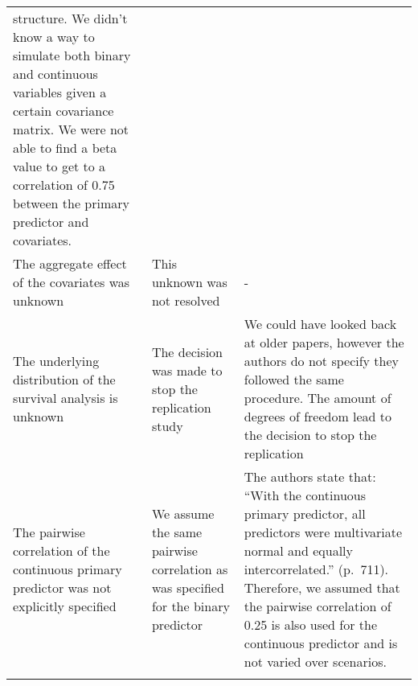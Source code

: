 \documentclass[10,a4paperpaper,]{article}
\begin{document}
\begin{longtable}[]{@{}lll@{}}
\begin{minipage}[t]{0.30\columnwidth}
structure. We didn't know a way to simulate both binary and continuous
variables given a certain covariance matrix. We were not able to find a
beta value to get to a correlation of 0.75 between the primary predictor
and covariates.\strut
\end{minipage}\tabularnewline
\begin{minipage}[t]{0.30\columnwidth}\raggedright
The aggregate effect of the covariates was unknown\strut
\end{minipage} & \begin{minipage}[t]{0.30\columnwidth}\raggedright
This unknown was not resolved\strut
\end{minipage} & \begin{minipage}[t]{0.30\columnwidth}\raggedright
-\strut
\end{minipage}\tabularnewline
\begin{minipage}[t]{0.30\columnwidth}\raggedright
The underlying distribution of the survival analysis is unknown\strut
\end{minipage} & \begin{minipage}[t]{0.30\columnwidth}\raggedright
The decision was made to stop the replication study\strut
\end{minipage} & \begin{minipage}[t]{0.30\columnwidth}\raggedright
We could have looked back at older papers, however the authors do not
specify they followed the same procedure. The amount of degrees of
freedom lead to the decision to stop the replication\strut
\end{minipage}\tabularnewline
\begin{minipage}[t]{0.30\columnwidth}\raggedright
The pairwise correlation of the continuous primary predictor was not
explicitly specified\strut
\end{minipage} & \begin{minipage}[t]{0.30\columnwidth}\raggedright
We assume the same pairwise correlation as was specified for the binary
predictor\strut
\end{minipage} & \begin{minipage}[t]{0.30\columnwidth}\raggedright
The authors state that: ``With the continuous primary predictor, all
predictors were multivariate normal and equally intercorrelated.''
(p.~711). Therefore, we assumed that the pairwise correlation of 0.25 is
also used for the continuous predictor and is not varied over
scenarios.\strut
\end{minipage}\tabularnewline
\begin{minipage}[t]{0.30\columnwidth}\raggedright

\end{minipage}
\end{longtable}
\end{document}
